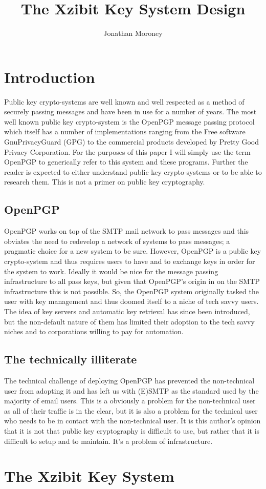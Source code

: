 \documentclass[a4paper,11pt]{article}
\title{The Xzibit Key System Design}
\author{Jonathan Moroney}
\begin{document}
\maketitle
\section{Introduction}
Public key crypto-systems are well known and well respected as a method of securely passing messages and have been in use for a number of years. The most well known public key crypto-system is the OpenPGP message passing protocol which itself has a number of implementations ranging from the Free software GnuPrivacyGuard (GPG) to the commercial products developed by Pretty Good Privacy Corporation. For the purposes of this paper I will simply use the term OpenPGP to generically refer to this system and these programs. Further the reader is expected to either understand public key crypto-systems or to be able to research them. This is not a primer on public key cryptography.
\subsection{OpenPGP}
OpenPGP works on top of the SMTP mail network to pass messages and this obviates the need to redevelop a network of systems to pass messages; a pragmatic choice for a new system to be sure. However, OpenPGP is a public key crypto-system and thus requires users to have and to exchange keys in order for the system to work. Ideally it would be nice for the message passing infrastructure to all pass keys, but given that OpenPGP's origin in on the SMTP infrastructure this is not possible. So, the OpenPGP system originally tasked the user with key management and thus doomed itself to a niche of tech savvy users. The idea of key servers and automatic key retrieval has since been introduced, but the non-default nature of them has limited their adoption to the tech savvy niches and to corporations willing to pay for automation. 
\subsection{The technically illiterate}
The technical challenge of deploying OpenPGP has prevented the non-technical user from adopting it and has left us with (E)SMTP as the standard used by the majority of email users. This is a obviously a problem for the non-technical user as all of their traffic is in the clear, but it is also a problem for the technical user who needs to be in contact with the non-technical user. It is this author's opinion that it is not that public key cryptography is difficult to use, but rather that it is difficult to setup and to maintain. It's a problem of infrastructure.
\section{The Xzibit Key System}
\end{document}
